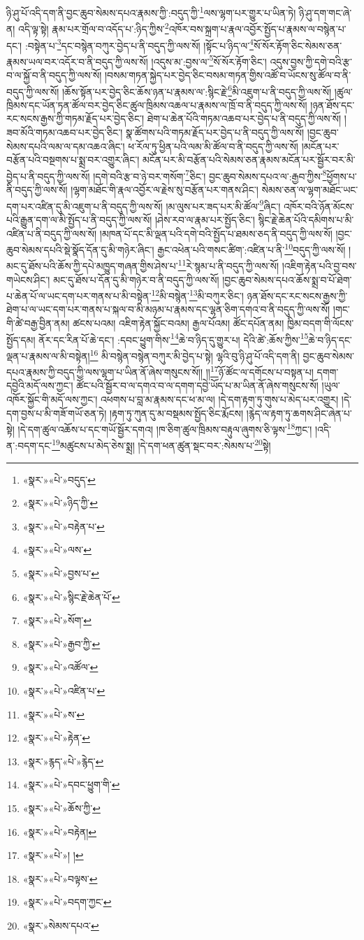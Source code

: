 ཉི་ཤུ་པོ་འདི་དག་ནི་བྱང་ཆུབ་སེམས་དཔའ་རྣམས་ཀྱི་:བདུད་ཀྱི་\footnote{«སྣར་»«པེ་»བདུད་}ལས་ལྷག་པར་གྱུར་པ་ཡིན་ཏེ། ཉི་ཤུ་དག་གང་ཞེ་ན། འདི་ལྟ་སྟེ། རྣམ་པར་གྲོལ་བ་འདོད་པ་:ཉིད་ཀྱིས་\footnote{«སྣར་»«པེ་»ཉིད་ཀྱི་}འཁོར་བས་སྐྲག་པ་རྣལ་འབྱོར་སྤྱོད་པ་རྣམས་ལ་བསྙེན་པ་དང་། :བསྟེན་པ་\footnote{«སྣར་»«པེ་»བརྟེན་པ་}དང་བསྙེན་བཀུར་བྱེད་པ་ནི་བདུད་ཀྱི་ལས་སོ། །སྟོང་པ་ཉིད་ལ་\footnote{«སྣར་»«པེ་»ལས་}སོ་སོར་རྟོག་ཅིང་སེམས་ཅན་རྣམས་ཡལ་བར་འདོར་བ་ནི་བདུད་ཀྱི་ལས་སོ། །འདུས་མ་:བྱས་ལ་\footnote{«སྣར་»«པེ་»བྱས་པ་}སོ་སོར་རྟོག་ཅིང་། འདུས་བྱས་ཀྱི་དགེ་བའི་རྩ་བ་ལ་སྐྱོ་བ་ནི་བདུད་ཀྱི་ལས་སོ། །བསམ་གཏན་སྐྱེད་པར་བྱེད་ཅིང་བསམ་གཏན་གྱིས་འཚོ་བ་ཡོངས་སུ་ཚོལ་བ་ནི་བདུད་ཀྱི་ལས་སོ། །ཆོས་སྟོན་པར་བྱེད་ཅིང་ཆོས་ཉན་པ་རྣམས་ལ་:སྙིང་རྗེ་\footnote{«སྣར་»«པེ་»སྙིང་རྗེ་ཆེན་པོ་}མི་འཇུག་པ་ནི་བདུད་ཀྱི་ལས་སོ། །ཚུལ་ཁྲིམས་དང་ཡོན་ཏན་ཚོལ་བར་བྱེད་ཅིང་ཚུལ་ཁྲིམས་འཆལ་པ་རྣམས་ལ་ཁྲོ་བ་ནི་བདུད་ཀྱི་ལས་སོ། །ཉན་ཐོས་དང་རང་སངས་རྒྱས་ཀྱི་གཏམ་རྗོད་པར་བྱེད་ཅིང་། ཐེག་པ་ཆེན་པོའི་གཏམ་འཆབ་པར་བྱེད་པ་ནི་བདུད་ཀྱི་ལས་སོ། །ཟབ་མོའི་གཏམ་འཆབ་པར་བྱེད་ཅིང་། སྣ་ཚོགས་པའི་གཏམ་རྗོད་པར་བྱེད་པ་ནི་བདུད་ཀྱི་ལས་སོ། །བྱང་ཆུབ་སེམས་དཔའི་ལམ་ལ་དམ་འཆའ་ཞིང་། ཕ་རོལ་ཏུ་ཕྱིན་པའི་ལམ་མི་ཚོལ་བ་ནི་བདུད་ཀྱི་ལས་སོ། །མངོན་པར་བརྩོན་པའི་བསྔགས་པ་སྨྲ་བར་འགྱུར་ཞིང་། མངོན་པར་མི་བརྩོན་པའི་སེམས་ཅན་རྣམས་མངོན་པར་སྦྱོར་བར་མི་བྱེད་པ་ནི་བདུད་ཀྱི་ལས་སོ། །དགེ་བའི་རྩ་བ་ཉེ་བར་གསོག་\footnote{«སྣར་»«པེ་»སོག་}ཅིང་། བྱང་ཆུབ་སེམས་དཔའ་ལ་:རྒྱབ་ཀྱིས་\footnote{«སྣར་»«པེ་»རྒྱབ་ཀྱི་}ཕྱོགས་པ་ནི་བདུད་ཀྱི་ལས་སོ། །ལྷག་མཐོང་གི་རྣལ་འབྱོར་ལ་རྗེས་སུ་བརྩོན་པར་གནས་ཤིང་། སེམས་ཅན་ལ་ལྷག་མཐོང་ཡང་དག་པར་འཛིན་དུ་མི་འཇུག་པ་ནི་བདུད་ཀྱི་ལས་སོ། །མ་ལུས་པར་ཟད་པར་མི་ཚོལ་\footnote{«སྣར་»«པེ་»འཚོལ་}ཞིང་། འཁོར་བའི་ཉོན་མོངས་པའི་རྒྱུན་དག་ལ་མི་སྤྱོད་པ་ནི་བདུད་ཀྱི་ལས་སོ། །ཤེས་རབ་ལ་རྣམ་པར་སྤྱོད་ཅིང་། སྙིང་རྗེ་ཆེན་པོའི་དམིགས་པ་མི་འཛིན་པ་ནི་བདུད་ཀྱི་ལས་སོ། །མཁན་པོ་དང་མི་ལྡན་པའི་དགེ་བའི་སྤྱོད་པ་ཐམས་ཅད་ནི་བདུད་ཀྱི་ལས་སོ། །བྱང་ཆུབ་སེམས་དཔའི་སྡེ་སྣོད་དོན་དུ་མི་གཉེར་ཞིང་། རྒྱང་འཕེན་པའི་གསང་ཚིག་:འཛིན་པ་ནི་\footnote{«སྣར་»«པེ་»འཛིན་པ་}བདུད་ཀྱི་ལས་སོ། །མང་དུ་ཐོས་པའི་ཆོས་ཀྱི་དཔེ་མཁྱུད་གཞན་གྱིས་ཤེས་པ་\footnote{«སྣར་»«པེ་»ས་}རེ་སྙམ་པ་ནི་བདུད་ཀྱི་ལས་སོ། །འཇིག་རྟེན་པའི་བྱ་བས་གཡེངས་ཤིང་། མང་དུ་ཐོས་པ་དོན་དུ་མི་གཉེར་བ་ནི་བདུད་ཀྱི་ལས་སོ། །བྱང་ཆུབ་སེམས་དཔའ་ཆོས་སྨྲ་བ་པོ་ཐེག་པ་ཆེན་པོ་ལ་ཡང་དག་པར་གནས་པ་མི་བསྟེན་\footnote{«སྣར་»«པེ་»རྟེན་}མི་བསྙེན་\footnote{«སྣར་»རྙད་«པེ་»རྙེད་}མི་བཀུར་ཅིང་། ཉན་ཐོས་དང་རང་སངས་རྒྱས་ཀྱི་ཐེག་པ་ལ་ཡང་དག་པར་གནས་པ་སྐལ་བ་མི་མཉམ་པ་རྣམས་དང་ལྷན་ཅིག་དགའ་བ་ནི་བདུད་ཀྱི་ལས་སོ། །གང་གི་ཚེ་བརྒྱ་བྱིན་ནམ། ཚངས་པའམ། འཇིག་རྟེན་སྐྱོང་བའམ། རྒྱལ་པོའམ། ཚོང་དཔོན་ནམ། ཁྱིམ་བདག་གི་ལོངས་སྤྱོད་དམ། ནོར་དང་རིན་པོ་ཆེ་དང་། :དབང་ཕྱུག་གིས་\footnote{«སྣར་»«པེ་»དབང་ཕྱུག་གི་}ཆེ་བ་ཉིད་དུ་གྱུར་པ། དེའི་ཚེ་:ཆོས་ཀྱིས་\footnote{«སྣར་»«པེ་»ཆོས་ཀྱི་}ཆེ་བ་ཉིད་དང་ལྡན་པ་རྣམས་ལ་མི་བསྟེན།\footnote{«སྣར་»«པེ་»བརྟེན།} མི་བསྙེན་བསྙེན་བཀུར་མི་བྱེད་པ་སྟེ། ལྷའི་བུ་ཉི་ཤུ་པོ་འདི་དག་ནི། བྱང་ཆུབ་སེམས་དཔའ་རྣམས་ཀྱི་བདུད་ཀྱི་ལས་ལྷག་པ་ཡིན་ནོ་ཞེས་གསུངས་སོ།། །།\footnote{«སྣར་»«པེ་»། །}ཉོ་ཚོང་ལ་དགོངས་པ་བསྟན་པ། དགག་དབྱེའི་མདོ་ལས་ཀྱང་། ཚོང་པའི་སྦྱོར་བ་ལ་དགའ་བ་ལ་དགག་དབྱེ་ཡོད་པ་མ་ཡིན་ནོ་ཞེས་གསུངས་སོ། །ཡུལ་འཁོར་སྐྱོང་གི་མདོ་ལས་ཀྱང་། འཕགས་པ་བླ་མ་རྣམས་དང་ཕ་མ་ལ། །དེ་དག་རྟག་ཏུ་གུས་པ་མེད་པར་འགྱུར། །དེ་དག་བྱས་པ་མི་གཟོ་གཡོ་ཅན་ཏེ། །རྟག་ཏུ་ཀུན་དུ་མ་བསྡམས་སྤྱོད་ཅིང་རྨོངས། །རྙེད་ལ་རྟག་ཏུ་ཆགས་ཤིང་ཞེན་པ་སྟེ། །དེ་དག་ཚུལ་འཆོས་པ་དང་གཡོ་སྦྱོར་དགའ། །ཁ་ཅིག་ཚུལ་ཁྲིམས་བརྟུལ་ཞུགས་ཅི་ལྟས་\footnote{«སྣར་»«པེ་»བལྟས་}ཀྱང་། །འདི་ན་:བདག་དང་\footnote{«སྣར་»«པེ་»བདག་ཀྱང་}མཚུངས་པ་མེད་ཅེས་སྨྲ། །དེ་དག་ཕན་ཚུན་སྡང་བར་:སེམས་པ་\footnote{«སྣར་»སེམས་དཔའ་}སྟེ། 